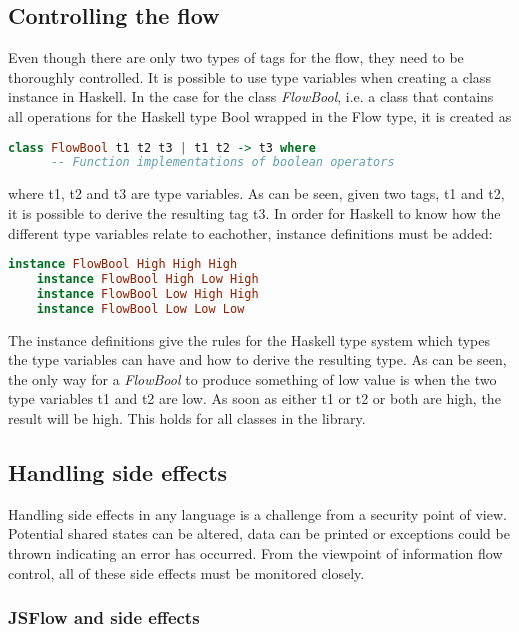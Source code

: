 \subsection{Controlling the flow}
Even though there are only two types of tags for the flow, they need to be thoroughly controlled. It is possible to use type variables when creating a class instance in Haskell. In the case for the class \emph{FlowBool}, i.e. a class that contains all operations for the Haskell type Bool wrapped in the Flow type, it is created as
\begin{center}
  \begin{lstlisting}[language=Haskell]
    class FlowBool t1 t2 t3 | t1 t2 -> t3 where
      -- Function implementations of boolean operators
  \end{lstlisting}
\end{center}
where t1, t2 and t3 are type variables. As can be seen, given two tags, t1 and t2, it is possible to derive the resulting tag t3. In order for Haskell to know how the different type variables relate to eachother, instance definitions must be added:
\begin{center}
  \begin{lstlisting}[language=Haskell]
    instance FlowBool High High High
    instance FlowBool High Low High
    instance FlowBool Low High High
    instance FlowBool Low Low Low
  \end{lstlisting}
\end{center}
The instance definitions give the rules for the Haskell type system which types the type variables can have and how to derive the resulting type. As can be seen, the only way for a \emph{FlowBool} to produce something of low value is when the two type variables t1 and t2 are low. As soon as either t1 or t2 or both are high, the result will be high. This holds for all classes in the library.

\subsection{Handling side effects}
Handling side effects in any language is a challenge from a security point of view. Potential shared states can be altered, data can be printed or exceptions could be thrown indicating an error has occurred. From the viewpoint of information flow control, all of these side effects must be monitored closely.

\subsubsection{JSFlow and side effects}

